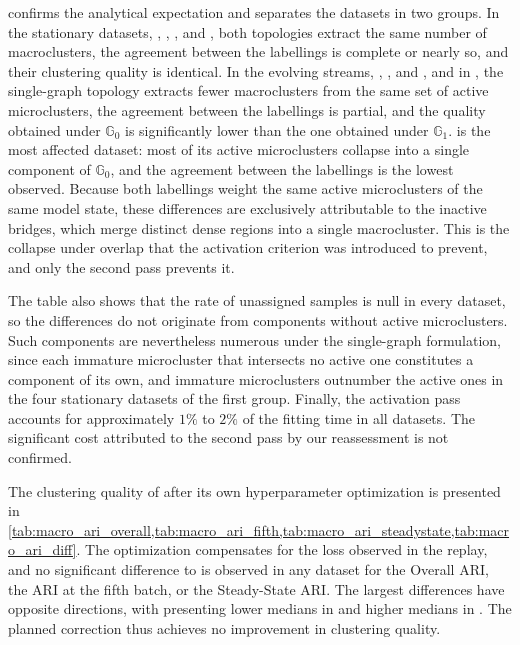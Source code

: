  confirms the analytical expectation and separates the datasets in two groups. In the stationary datasets, \ChameleonDSThree, \ChameleonDSFour, , and , both topologies extract the same number of macroclusters, the agreement between the labellings is complete or nearly so, and their clustering quality is identical. In the evolving streams, , , and , and in \Cassini, the single-graph topology extracts fewer macroclusters from the same set of active microclusters, the agreement between the labellings is partial, and the quality obtained under $\mathbb{G}_0$ is significantly lower than the one obtained under $\mathbb{G}_1$. \Cassini is the most affected dataset: most of its active microclusters collapse into a single component of $\mathbb{G}_0$, and the agreement between the labellings is the lowest observed. Because both labellings weight the same active microclusters of the same model state, these differences are exclusively attributable to the inactive bridges, which merge distinct dense regions into a single macrocluster. This is the collapse under overlap that the activation criterion was introduced to prevent, and only the second pass prevents it.

The table also shows that the rate of unassigned samples is null in every dataset, so the differences do not originate from components without active microclusters. Such components are nevertheless numerous under the single-graph formulation, since each immature microcluster that intersects no active one constitutes a component of its own, and immature microclusters outnumber the active ones in the four stationary datasets of the first group. Finally, the activation pass accounts for approximately $1\%$ to $2\%$ of the fitting time in all datasets. The significant cost attributed to the second pass by our reassessment is not confirmed.

The clustering quality of  after its own hyperparameter optimization is presented in \cref{tab:macro_ari_overall,tab:macro_ari_fifth,tab:macro_ari_steadystate,tab:macro_ari_diff}. The optimization compensates for the loss observed in the replay, and no significant difference to  is observed in any dataset for the Overall ARI, the ARI at the fifth batch, or the Steady-State ARI. The largest differences have opposite directions, with  presenting lower medians in  and higher medians in . The planned correction thus achieves no improvement in clustering quality.

